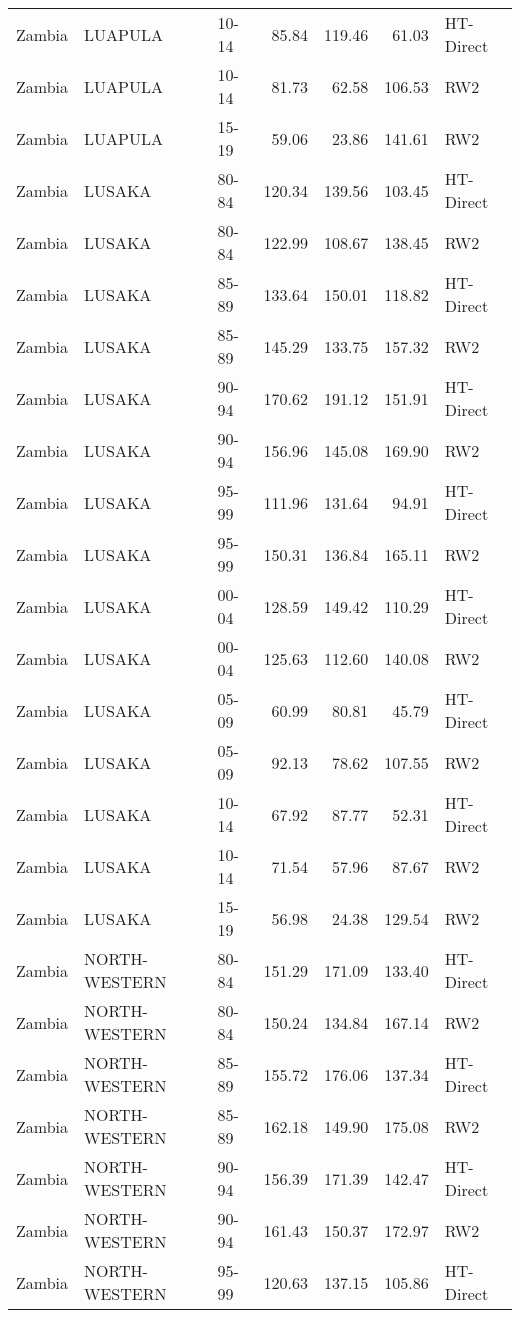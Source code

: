 \begin{longtable}{lllrrrl}
  Zambia & LUAPULA & 10-14 & 85.84 & 119.46 & 61.03 & HT-Direct \\ 
  Zambia & LUAPULA & 10-14 & 81.73 & 62.58 & 106.53 & RW2 \\ 
  Zambia & LUAPULA & 15-19 & 59.06 & 23.86 & 141.61 & RW2 \\ 
  Zambia & LUSAKA & 80-84 & 120.34 & 139.56 & 103.45 & HT-Direct \\ 
  Zambia & LUSAKA & 80-84 & 122.99 & 108.67 & 138.45 & RW2 \\ 
  Zambia & LUSAKA & 85-89 & 133.64 & 150.01 & 118.82 & HT-Direct \\ 
  Zambia & LUSAKA & 85-89 & 145.29 & 133.75 & 157.32 & RW2 \\ 
  Zambia & LUSAKA & 90-94 & 170.62 & 191.12 & 151.91 & HT-Direct \\ 
  Zambia & LUSAKA & 90-94 & 156.96 & 145.08 & 169.90 & RW2 \\ 
  Zambia & LUSAKA & 95-99 & 111.96 & 131.64 & 94.91 & HT-Direct \\ 
  Zambia & LUSAKA & 95-99 & 150.31 & 136.84 & 165.11 & RW2 \\ 
  Zambia & LUSAKA & 00-04 & 128.59 & 149.42 & 110.29 & HT-Direct \\ 
  Zambia & LUSAKA & 00-04 & 125.63 & 112.60 & 140.08 & RW2 \\ 
  Zambia & LUSAKA & 05-09 & 60.99 & 80.81 & 45.79 & HT-Direct \\ 
  Zambia & LUSAKA & 05-09 & 92.13 & 78.62 & 107.55 & RW2 \\ 
  Zambia & LUSAKA & 10-14 & 67.92 & 87.77 & 52.31 & HT-Direct \\ 
  Zambia & LUSAKA & 10-14 & 71.54 & 57.96 & 87.67 & RW2 \\ 
  Zambia & LUSAKA & 15-19 & 56.98 & 24.38 & 129.54 & RW2 \\ 
  Zambia & NORTH-WESTERN & 80-84 & 151.29 & 171.09 & 133.40 & HT-Direct \\ 
  Zambia & NORTH-WESTERN & 80-84 & 150.24 & 134.84 & 167.14 & RW2 \\ 
  Zambia & NORTH-WESTERN & 85-89 & 155.72 & 176.06 & 137.34 & HT-Direct \\ 
  Zambia & NORTH-WESTERN & 85-89 & 162.18 & 149.90 & 175.08 & RW2 \\ 
  Zambia & NORTH-WESTERN & 90-94 & 156.39 & 171.39 & 142.47 & HT-Direct \\ 
  Zambia & NORTH-WESTERN & 90-94 & 161.43 & 150.37 & 172.97 & RW2 \\ 
  Zambia & NORTH-WESTERN & 95-99 & 120.63 & 137.15 & 105.86 & HT-Direct \\ 

\end{longtable}
